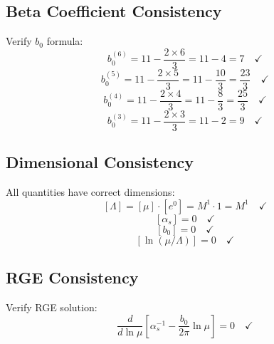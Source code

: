 \documentclass[11pt,a4paper]{article}
\theoremstyle{definition}
\begin{document}
\subsection{Beta Coefficient Consistency}
\label{subsec:beta-consistency}

Verify $b_0$ formula:
\begin{equation}
\label{eq:b0-check-nf6}
b_0^{(6)} = 11 - \frac{2 \times 6}{3} = 11 - 4 = 7 \quad \checkmark
\end{equation}
\begin{equation}
\label{eq:b0-check-nf5}
b_0^{(5)} = 11 - \frac{2 \times 5}{3} = 11 - \frac{10}{3} = \frac{23}{3} \quad \checkmark
\end{equation}
\begin{equation}
\label{eq:b0-check-nf4}
b_0^{(4)} = 11 - \frac{2 \times 4}{3} = 11 - \frac{8}{3} = \frac{25}{3} \quad \checkmark
\end{equation}
\begin{equation}
\label{eq:b0-check-nf3}
b_0^{(3)} = 11 - \frac{2 \times 3}{3} = 11 - 2 = 9 \quad \checkmark
\end{equation}

\subsection{Dimensional Consistency}
\label{subsec:dim-consistency}

All quantities have correct dimensions:
\begin{equation}
\label{eq:dim-check-lambda}
[\Lambda] = [\mu] \cdot [e^{0}] = M^1 \cdot 1 = M^1 \quad \checkmark
\end{equation}
\begin{equation}
\label{eq:dim-check-alpha}
[\alpha_s] = 0 \quad \checkmark
\end{equation}
\begin{equation}
\label{eq:dim-check-b0}
[b_0] = 0 \quad \checkmark
\end{equation}
\begin{equation}
\label{eq:dim-check-log}
[\ln(\mu/\Lambda)] = 0 \quad \checkmark
\end{equation}

\subsection{RGE Consistency}
\label{subsec:rge-consistency}

Verify RGE solution:
\begin{equation}
\label{eq:rge-check-1}
\frac{d}{d\ln\mu}\left[\alpha_s^{-1} - \frac{b_0}{2\pi}\ln\mu\right] = 0 \quad \checkmark
\end{equation}
\end{document}
